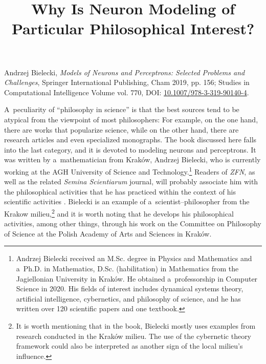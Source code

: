 

\title{Why Is Neuron Modeling of Particular Philosophical Interest?}
\maketitle

Andrzej Bielecki, \textit{Models of Neurons and Perceptrons: Selected Problems and Challenges}, Springer International Publishing, Cham 2019, pp. 156; Studies in Computational Intelligence Volume vol. 770, DOI: \href{https://doi.org/10.1007/978-3-319-90140-4}{10.1007/978-3-319-90140-4}.

A~peculiarity of ``philosophy in science''
\parencites[see][]{heller_how_2019}[][]{polak_philosophy_2019} %
 is that the best sources tend to be atypical from the viewpoint of most philosophers: For example, on the one hand, there are works that popularize science, while on the other hand, there are research articles and even specialized monographs. The book discussed here falls into the last category, and it is devoted to modeling neurons and perceptrons. It was written by a~mathematician from Kraków, Andrzej Bielecki, who is currently working at the AGH University of Science and Technology.\footnote{Andrzej Bielecki received an M.Sc. degree in Physics and Mathematics and a~Ph.D. in Mathematics, D.Sc. (habilitation) in Mathematics from the Jagiellonian University in Kraków. He obtained a~professorship in Computer Science in 2020. His fields of interest includes dynamical systems theory, artificial intelligence, cybernetics, and philosophy of science, and he has written over 120 scientific papers and one textbook.} Readers of \textit{ZFN}, as well as the related \textit{Semina Scientiarum} journal, will probably associate him with the philosophical activities that he has practiced within the context of his scientific activities 
\parencites*[][]{bielecki_cybernetyczna_2016}[][]{}. %
 Bielecki is an example of a~scientist–philosopher from the Krakow milieu,\footnote{It is worth mentioning that in the book, Bielecki mostly uses examples from research conducted in the Kraków milieu. The use of the cybernetic theory framework could also be interpreted as another sign of the local milieu's influence.} and it is worth noting that he develops his philosophical activities, among other things, through his work on the Committee on Philosophy of Science at the Polish Academy of Arts and Sciences in Kraków.

